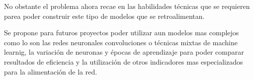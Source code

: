 \documentclass[letterpaper,12pt,oneside]{book}
\begin{document}
No obstante el problema ahora recae en las habilidades técnicas que se requieren parea poder construir este tipo de modelos que se retroalimentan.
\vspace{0.5cm}


Se propone para futuros proyectos poder utilizar aun modelos mas complejos como lo son las redes neuronales convoluciones o técnicas mixtas de machine learnig, la variación de neuronas y épocas de aprendizaje para poder comparar resultados de eficiencia y la utilización de otros indicadores mas especializados para la alimentación de la red.





\end{document}
